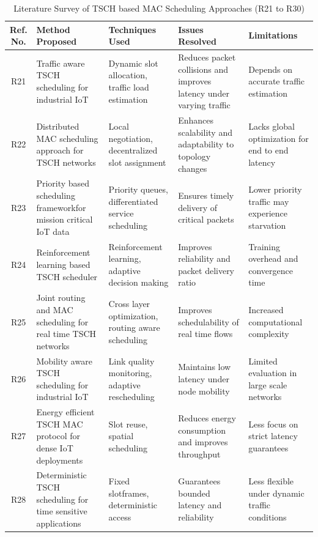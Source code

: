 \documentclass[a4paper,fleqn]{cas-dc}
\numberwithin{equation}{section}
\begin{document}
\begin{table}[htbp]
\centering
\caption{Literature Survey of TSCH based MAC Scheduling Approaches (R21 to R30)}
\label{tab:litsurvey_r23_r32}
\renewcommand{\arraystretch}{1.2}
\begin{tabular}{|c|p{3.2cm}|p{3.2cm}|p{3.4cm}|p{3.2cm}|}
\hline
\textbf{Ref. No.} & \textbf{Method Proposed} & \textbf{Techniques Used} & \textbf{Issues Resolved} & \textbf{Limitations} \\
\hline
R21 & Traffic aware TSCH scheduling for industrial IoT\cite{brun2019optimized} & Dynamic slot allocation, traffic load estimation & Reduces packet collisions and improves latency under varying traffic & Depends on accurate traffic estimation \\
\hline
R22 & Distributed MAC scheduling approach for TSCH networks\cite{vindhyan2020low} & Local negotiation, decentralized slot assignment & Enhances scalability and adaptability to topology changes & Lacks global optimization for end to end latency \\
\hline
R23 & Priority based scheduling framework\cite{khisa2021priority}for mission critical IoT data & Priority queues, differentiated service scheduling & Ensures timely delivery of critical packets & Lower priority traffic may experience starvation \\
\hline
R24 & Reinforcement learning based TSCH scheduler\cite{shudrenko2024modeling} & Reinforcement learning, adaptive decision making & Improves reliability and packet delivery ratio & Training overhead and convergence time \\
\hline
R25 & Joint routing and MAC scheduling for real time TSCH networks\cite{tavallaie2023gt} & Cross layer optimization, routing aware scheduling & Improves schedulability of real time flows & Increased computational complexity \\
\hline
R26 & Mobility aware TSCH scheduling for industrial IoT\cite{choudhury2021centralized} & Link quality monitoring, adaptive rescheduling & Maintains low latency under node mobility & Limited evaluation in large scale networks \\
\hline
R27 & Energy efficient TSCH MAC protocol for dense IoT deployments\cite{yoo2021analysis} & Slot reuse, spatial scheduling & Reduces energy consumption and improves throughput & Less focus on strict latency guarantees \\
\hline
R28 & Deterministic TSCH scheduling for time sensitive applications\cite{carie2023directional} & Fixed slotframes, deterministic access & Guarantees bounded latency and reliability & Less flexible under dynamic traffic conditions \\

\end{tabular}
\end{table}
\end{document}
